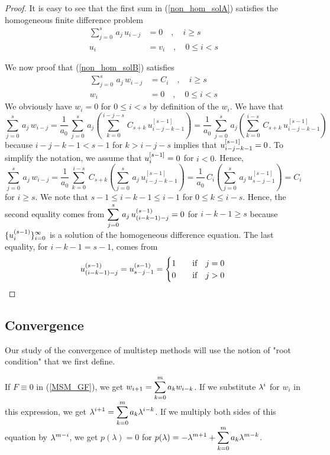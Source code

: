 \begin{proof}
It is easy to see that the first sum in (\ref{non_hom_solA}) satisfies
the homogeneous finite difference problem
\begin{align*}
\sum_{j=0}^s\,a_j\,u_{i-j} &= 0 \quad, \quad i \geq s \\
u_i &= v_i \quad, \quad 0 \leq i < s
\end{align*}

We now proof that (\ref{non_hom_solB}) satisfies
\begin{align*}
\sum_{j=0}^s\,a_j\,w_{i-j} &= C_i \quad, \quad i\geq s \\
w_i &= 0 \quad, \quad 0 \leq i < s
\end{align*}
We obviously have $w_i =0$ for $0 \leq i <s$ by definition of the
$w_i$.  We have that
\[
\sum_{j=0}^s\,a_j\,w_{i-j} = \frac{1}{a_0}\,
\sum_{j=0}^s\,a_j\left(\sum_{k=0}^{i-j-s}\,C_{s+k}\,u_{i-j-k-1}^{[s-1]}\right)
= \frac{1}{a_0}\,
\sum_{j=0}^s\,a_j\left(\sum_{k=0}^{i-s}\,C_{s+k}\,u_{i-j-k-1}^{[s-1]}\right)
\]
because $i-j-k-1 < s-1$ for $k>i-j-s$ implies that
$\displaystyle u_{i-j-k-1}^{[s-1]} = 0$.  To simplify the notation, we
assume that $\displaystyle u_i^{[s-1]} = 0$ for $i<0$.  Hence,
\[
\sum_{j=0}^s\,a_j\,w_{i-j} =
\frac{1}{a_0}\,\sum_{k=0}^{i-s}\,C_{s+k}
\left(\sum_{j=0}^s\,a_j\,u_{i-j-k-1}^{[s-1]}\right)
= \frac{1}{a_0}\,C_i\left(\sum_{j=0}^s\,a_j\,u_{s-j-1}^{[s-1]}\right) = C_i
\]
for $i\geq s$.   We note that
$s-1 \leq i-k-1 \leq i-1$ for $0\leq k \leq i-s$.  Hence, the second
equality comes from 
$\displaystyle \sum_{j=0}^s\,a_j\,u_{(i-k-1)-j}^{(s-1)} = 0$ 
for $i-k-1 \geq s$ because
$\displaystyle \{ u_i^{(s-1)} \}_{i=0}^\infty$ is a solution of the homogeneous
difference equation.  The last equality, for $i-k-1 = s-1$, comes from
\[
  u_{(i-k-1)-j}^{(s-1)} = u_{s-j-1}^{(s-1)}
= \begin{cases}
  1 & \quad \text{if} \quad j = 0 \\
  0 & \quad \text{if} \quad j > 0
\end{cases}  \qedhere
\]
\end{proof}

\subsection{Convergence}

Our study of the convergence of multistep methods will use the notion of
"root condition" that we first define.

If $F \equiv 0$ in (\ref{MSM_GF}), we get
$\displaystyle w_{i+1} = \sum_{k=0}^m a_k w_{i-k}$.
If we substitute $\displaystyle \lambda^i$ for $w_i$ in this expression, we get
$\displaystyle \lambda^{i+1} = \sum_{k=0}^m a_k \lambda^{i-k}$. 
If we multiply both sides of this equation by
$\displaystyle \lambda^{m-i}$, we get $p(\lambda) = 0$ for
$\displaystyle p(\lambda) = - \lambda^{m+1} + \sum_{k=0}^m a_k \lambda^{m-k}$.

